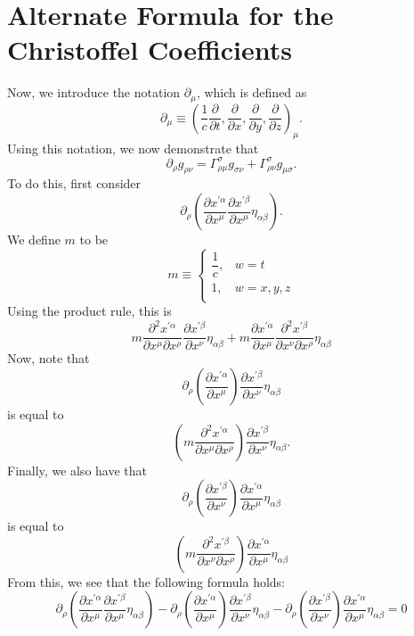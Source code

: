 \documentclass[12pt]{article}
\theoremstyle{definition}
\theoremstyle{remark}
\begin{document}
\section{Alternate Formula for the Christoffel Coefficients}

Now, we introduce the notation $\partial_{\mu}$, which is defined as 
\[
\partial_{\mu} \equiv \left( \frac{1}{c} \frac{ \partial }{  \partial t } , \frac{ \partial }{ \partial x} , \frac{ \partial }{ \partial y }, \frac{ \partial }{ \partial z } \right)_{\mu} .
\]
Using this notation, we now demonstrate that 
\[
\partial_{\rho} g_{\rho \nu} = \Gamma^{ \sigma }_{ \rho \mu } g_{ \sigma \nu } + \Gamma^{ \sigma }_{ \rho \nu } g_{ \mu \sigma } .
\]
To do this, first consider 
\[
\partial_{\rho} 
\left( \frac{ \partial x^{ \prime \alpha } }{ \partial x^{ \mu } } 
\frac{ \partial x^{ \prime \beta } }{ \partial x^{ \mu } } 
\eta_{ \alpha \beta } \right).
\]
We define $m$ to be 
\[
m \equiv 
\begin{cases} 
\dfrac{1}{c} ,& w = t \\
1 ,& w = x,y,z \\
\end{cases}
\]
Using the product rule, this is
\[
m \frac{ \partial^2 x^{ \prime \alpha } }{ \partial x^{ \mu } \partial x^{ \rho } } 
\frac{ \partial x^{ \prime \beta } }{ \partial x^{ \nu } }
\eta_{ \alpha \beta }
+
m \frac{ \partial x^{ \prime \alpha } }{ \partial x^{ \mu } } 
\frac{ \partial^2 x^{ \prime \beta } }{ \partial x^{ \nu } \partial x^{ \rho } } \eta_{ \alpha \beta }
\]
Now, note that
\[
\partial_{ \rho } \left( \frac{ \partial x^{ \prime \alpha } }{ \partial x^{ \mu } } \right)
\frac{ \partial x^{ \prime \beta } }{ \partial x^{ \nu } } \eta_{\alpha \beta } 
\]
is equal to
\[
\left( m \frac{ \partial^2 x^{ \prime \alpha } }{ \partial x^{ \mu } \partial x^{ \rho } } \right) \frac{ \partial x^{ \prime \beta } }{ \partial x^{ \nu } } \eta_{ \alpha \beta }.
\]
Finally, we also have that
\[
\partial_{ \rho } 
\left( \frac{ \partial x^{ \prime \beta } }{ \partial x^{ \nu } }  \right)
\frac{ \partial x^{ \prime \alpha } }{ \partial x^{ \mu } } \eta_{ \alpha \beta} 
\]
is equal to 
\[
\left( m \frac{ \partial^2 x^{ \prime \beta } }{ \partial x^{ \nu } \partial x^{ \rho } } \right) \frac{ \partial x^{ \prime \alpha } }{ \partial x^{ \mu } } \eta_{ \alpha \beta}
\]
From this, we see that the following formula holds:
\[
\partial_{\rho} 
\left( \frac{ \partial x^{ \prime \alpha } }{ \partial x^{ \mu } } 
\frac{ \partial x^{ \prime \beta } }{ \partial x^{ \mu } } 
\eta_{ \alpha \beta } \right)
-
\partial_{ \rho }
\left( \frac{ \partial x^{ \prime \alpha } }{ \partial x^{ \mu } } \right) 
\frac{ \partial x^{ \prime \beta } }{ \partial x^{ \nu } } 
\eta_{ \alpha \beta }
-
\partial_{ \rho } 
\left( \frac{ \partial x^{ \prime \beta } }{ \partial x^{ \nu } } \right) 
\frac{ \partial x^{ \prime \alpha } }{ \partial x^{ \mu } } \eta_{\alpha \beta } 
=
0
\]
\end{document}
